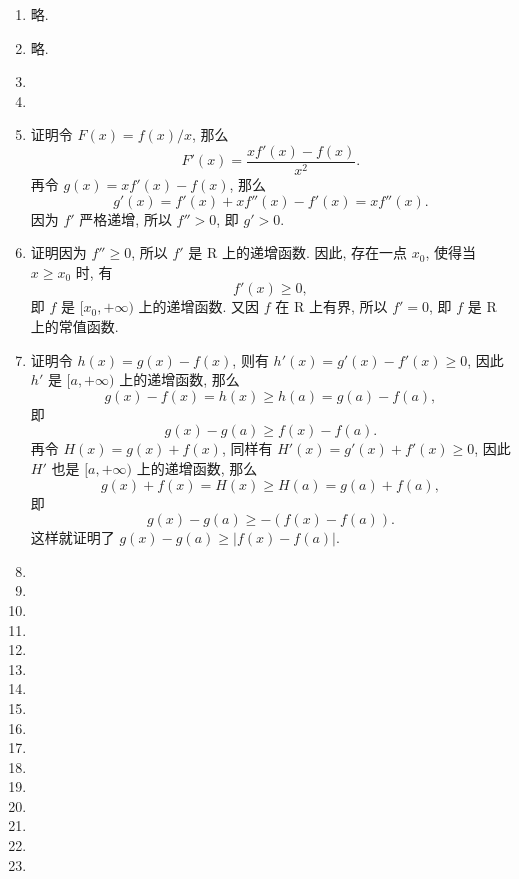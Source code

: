 \documentclass[a4paper, 10pt]{ctexart}
\begin{document}
\pagestyle{empty}
\begin{enumerate}
    \item %
        略.
    \item %
        略.
    \item %
    \item %
    \item %
        {\heiti 证明}\quad 令 $F(x) = f(x)/x$, 那么
        \[
            F'(x) = \frac{xf'(x) - f(x)}{x^2}.    
        \]
        再令 $g(x) = xf'(x) - f(x)$, 那么
        \[
            g'(x) = f'(x) + xf''(x) - f'(x) = xf''(x).    
        \]
        因为 $f'$ 严格递增, 所以 $f'' > 0$, 即 $g' > 0$.
    \item %
        {\heiti 证明}\quad 因为 $f'' \geqslant 0$, 所以 $f'$ 是 $\mathrm{R}$ 上的递增函数.
        因此, 存在一点 $x_0$, 使得当 $x \geqslant x_0$ 时, 有
        \[
            f'(x) \geqslant 0,
        \]
        即 $f$ 是 $[x_0, +\infty)$ 上的递增函数. 又因 $f$ 在 $\mathrm{R}$ 上有界, 所以 $f' = 0$, 即 $f$ 是 $\mathrm{R}$ 上的常值函数.
    \item %
        {\heiti 证明}\quad 令 $h(x) = g(x) - f(x)$, 则有 $h'(x) = g'(x) - f'(x) \geqslant 0$, 因此 $h'$ 是 $[a, +\infty)$ 上的递增函数, 那么
        \[
            g(x) - f(x) = h(x) \geqslant h(a) = g(a) - f(a),
        \]
        即
        \[
            g(x) - g(a) \geqslant f(x) - f(a).    
        \]
        再令 $H(x) = g(x) + f(x)$, 同样有 $H'(x) = g'(x) + f'(x) \geqslant 0$, 因此 $H'$ 也是 $[a, +\infty)$ 上的递增函数, 那么
        \[
            g(x) + f(x) = H(x) \geqslant H(a) = g(a) + f(a),    
        \]
        即
        \[
            g(x) - g(a) \geqslant -(f(x) - f(a)).     
        \]
        这样就证明了 $g(x) - g(a) \geqslant |f(x) - f(a)|$.
    \item %
    \item %
    \item %
    \item %
    \item %
    \item %
    \item %
    \item %
    \item %
    \item %
    \item %
    \item %
    \item %
    \item %
    \item %
    \item %
\end{enumerate}
\end{document}
